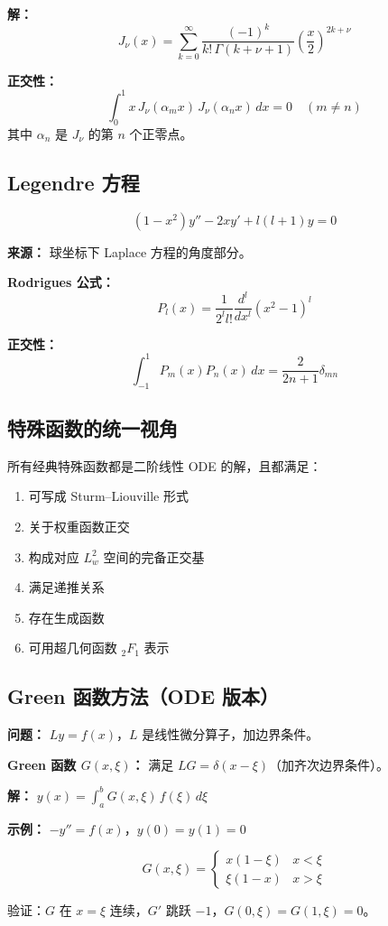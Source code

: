 \textbf{解：}
\[
J_\nu(x) = \sum_{k=0}^{\infty} \frac{(-1)^k}{k!\,\Gamma(k+\nu+1)}\left(\frac{x}{2}\right)^{2k+\nu}
\]

\textbf{正交性：}
\[
\int_0^1 x\, J_\nu(\alpha_m x)\, J_\nu(\alpha_n x)\,dx = 0 \quad (m \neq n)
\]
其中 $\alpha_n$ 是 $J_\nu$ 的第 $n$ 个正零点。

\subsection{Legendre 方程}

\[
(1-x^2)y'' - 2xy' + l(l+1)y = 0
\]

\textbf{来源：} 球坐标下 Laplace 方程的角度部分。

\textbf{Rodrigues 公式：}
\[
P_l(x) = \frac{1}{2^l l!}\frac{d^l}{dx^l}(x^2-1)^l
\]

\textbf{正交性：}
\[
\int_{-1}^1 P_m(x) P_n(x)\,dx = \frac{2}{2n+1}\delta_{mn}
\]

\subsection{特殊函数的统一视角}

所有经典特殊函数都是二阶线性 ODE 的解，且都满足：
\begin{enumerate}
  \item 可写成 Sturm--Liouville 形式
  \item 关于权重函数正交
  \item 构成对应 $L^2_w$ 空间的完备正交基
  \item 满足递推关系
  \item 存在生成函数
  \item 可用超几何函数 $_2F_1$ 表示
\end{enumerate}

\subsection{Green 函数方法（ODE 版本）}

\textbf{问题：} $Ly = f(x)$，$L$ 是线性微分算子，加边界条件。

\textbf{Green 函数 $G(x,\xi)$：} 满足 $LG = \delta(x-\xi)$（加齐次边界条件）。

\textbf{解：} $y(x) = \int_a^b G(x,\xi)\,f(\xi)\,d\xi$

\textbf{示例：} $-y'' = f(x)$，$y(0) = y(1) = 0$

\[
G(x,\xi) = \begin{cases} x(1-\xi) & x < \xi \\ \xi(1-x) & x > \xi \end{cases}
\]

验证：$G$ 在 $x = \xi$ 连续，$G'$ 跳跃 $-1$，$G(0,\xi) = G(1,\xi) = 0$。